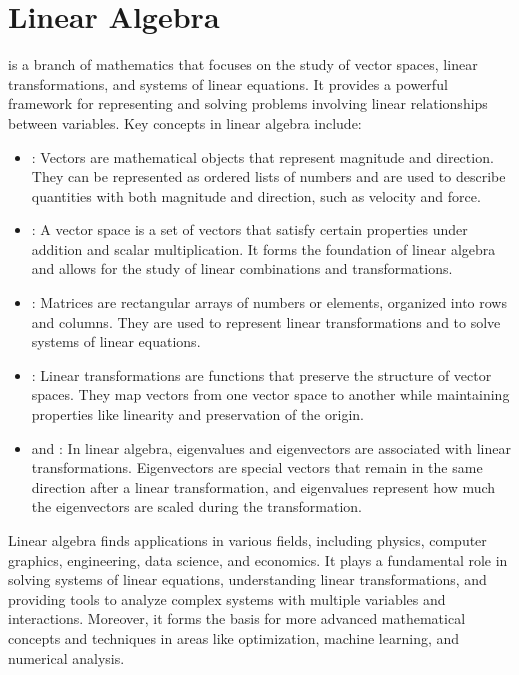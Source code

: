 \chapter{Linear Algebra}
\thispagestyle{fancy}

 is a branch of mathematics that focuses on the study of vector spaces, linear transformations, and systems of linear equations. It provides a powerful framework for representing and solving problems involving linear relationships between variables. Key concepts in linear algebra include:

\begin{itemize}
	\item {}: Vectors are mathematical objects that represent magnitude and direction. They can be represented as ordered lists of numbers and are used to describe quantities with both magnitude and direction, such as velocity and force.
	
	\item {}: A vector space is a set of vectors that satisfy certain properties under addition and scalar multiplication. It forms the foundation of linear algebra and allows for the study of linear combinations and transformations.
	
	\item {}: Matrices are rectangular arrays of numbers or elements, organized into rows and columns. They are used to represent linear transformations and to solve systems of linear equations.
	
	\item {}: Linear transformations are functions that preserve the structure of vector spaces. They map vectors from one vector space to another while maintaining properties like linearity and preservation of the origin.
	
	\item {} and : In linear algebra, eigenvalues and eigenvectors are associated with linear transformations. Eigenvectors are special vectors that remain in the same direction after a linear transformation, and eigenvalues represent how much the eigenvectors are scaled during the transformation.
\end{itemize}

Linear algebra finds applications in various fields, including physics, computer graphics, engineering, data science, and economics. It plays a fundamental role in solving systems of linear equations, understanding linear transformations, and providing tools to analyze complex systems with multiple variables and interactions. Moreover, it forms the basis for more advanced mathematical concepts and techniques in areas like optimization, machine learning, and numerical analysis.


